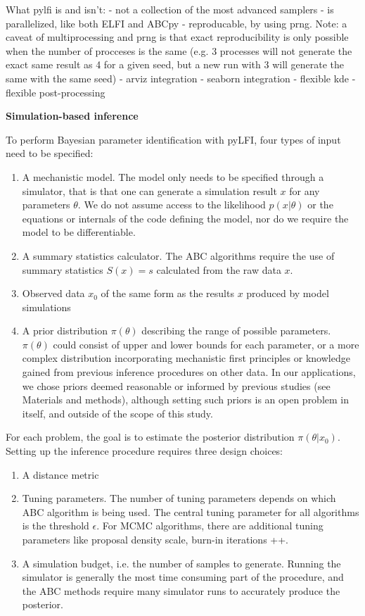 What pylfi is and isn’t:
- not a collection of the most advanced samplers
- is parallelized, like both ELFI and ABCpy
- reproducable, by using prng. Note: a caveat of multiprocessing and prng is that exact reproducibility is only possible when the number of procceses is the same (e.g. 3 processes will not generate the exact same result as 4 for a given seed, but a new run with 3 will generate the same with the same seed)
- arviz integration
- seaborn integration
- flexible kde
- flexible post-processing


\textbf{Simulation-based inference} 


To perform Bayesian parameter identification with pyLFI, four types of input need to be specified: 

\begin{enumerate}
    \item A mechanistic model. The model only needs to be specified through a simulator, that is that one can generate a simulation result $x$ for any parameters $\theta$. We do not assume access to the likelihood $p(x | \theta)$ or the equations or internals of the code defining the model, nor do we require the model to be differentiable. 
    \item A summary statistics calculator. The ABC algorithms require the use of summary statistics $S(x)=s$ calculated from the raw data $x$. 
    \item Observed data $x_0$ of the same form as the results $x$ produced by model simulations
    \item A prior distribution $\pi (\theta)$ describing the range of possible parameters. $\pi (\theta)$ could consist of upper and lower bounds for each parameter, or a more complex distribution incorporating mechanistic first principles or knowledge gained from previous inference procedures on other data. In our applications, we chose priors deemed reasonable or informed by previous studies (see Materials and methods), although setting such priors is an open problem in itself, and outside of the scope of this study.
\end{enumerate}

For each problem, the goal is to estimate the posterior distribution $\pi(\theta | x_0)$. Setting up the inference procedure requires three design choices: 
\begin{enumerate}
    \item A distance metric
    \item Tuning parameters. The number of tuning parameters depends on which ABC algorithm is being used. The central tuning parameter for all algorithms is the threshold $\epsilon$. For MCMC algorithms, there are additional tuning parameters like proposal density scale, burn-in iterations ++. 
    \item A simulation budget, i.e. the number of samples to generate. Running the simulator is generally the most time consuming part of the procedure, and the ABC methods require many simulator runs to accurately produce the posterior. 
\end{enumerate}

